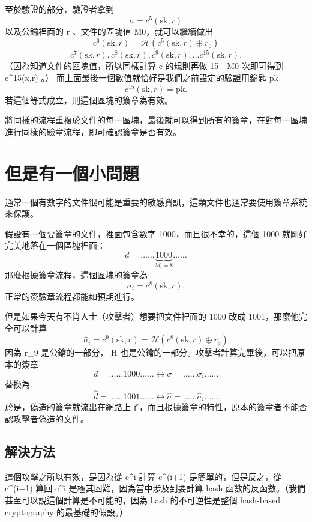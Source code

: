 \documentclass[
]{article}
\begin{document}
至於驗證的部分，驗證者拿到 \[
\sigma = c^{5}(\mathrm{sk},r)
\] 以及公鑰裡面的 r 、文件的區塊值 M0，就可以繼續做出 \[
c^{6}(\mathrm{sk},r) = \mathcal{H}(c^{5}(\mathrm{sk},r)\oplus r_{6})
\] \[
c^{7}(\mathrm{sk},r), c^{8}(\mathrm{sk},r),   c^{9}(\mathrm{sk},r), \dots  c^{15}(\mathrm{sk},r). 
\] （因為知道文件的區塊值，所以同樣計算 c 的規則再做 15 - M0 次即可得到
c\^{}15(x,r) 。） 而上面最後一個數值就恰好是我們之前設定的驗證用鑰匙 pk
\[
c^{15}(\mathrm{sk},r) = \mathrm{pk}.
\] 若這個等式成立，則這個區塊的簽章為有效。

將同樣的流程重複於文件的每一區塊，最後就可以得到所有的簽章，在對每一區塊進行同樣的驗章流程，即可確認簽章是否有效。

\hypertarget{ux4f46ux662fux6709ux4e00ux500bux5c0fux554fux984c}{%
\section{但是有一個小問題}\label{ux4f46ux662fux6709ux4e00ux500bux5c0fux554fux984c}}

通常一個有數字的文件很可能是重要的敏感資訊，這類文件也通常要使用簽章系統來保護。

假設有一個要簽章的文件，裡面包含數字 1000，而且很不幸的，這個 1000
就剛好完美地落在一個區塊裡面： \[
d = \dots\dots \underbrace{ 1000 }_{ M_{i} = 8 } \dots\dots
\] 那麼根據簽章流程，這個區塊的簽章為 \[
\sigma_{i} =c^{8}(\mathrm{sk},r).
\] 正常的簽驗章流程都能如預期進行。

但是如果今天有不肖人士（攻擊者）想要把文件裡面的 1000 改成
1001，那麼他完全可以計算 \[
\hat{\sigma}_{i} =  c^{9}(\mathrm{sk},r)  = \mathcal{H}(c^{8}(\mathrm{sk},r)\oplus r_{9})
\] 因為 r\_9 是公鑰的一部分， H
也是公鑰的一部分。攻擊者計算完畢後，可以把原本的簽章 \[
d = \dots\dots 1000\dots\ldots \leftrightarrow \sigma = \dots\dots \sigma_{i}\dots\ldots 
\] 替換為 \[
\hat{d} = \dots\dots 1001\dots\ldots \leftrightarrow \hat{\sigma} = \dots\dots \hat{\sigma}_{i}\dots\ldots 
\]
於是，偽造的簽章就流出在網路上了，而且根據簽章的特性，原本的簽章者不能否認攻擊者偽造的文件。

\hypertarget{ux89e3ux6c7aux65b9ux6cd5}{%
\subsection{解決方法}\label{ux89e3ux6c7aux65b9ux6cd5}}

這個攻擊之所以有效，是因為從 c\^{}i 計算 c\^{}(i+1)
是簡單的，但是反之，從 c\^{}(i+1) 算回 c\^{}i
是極其困難，因為當中涉及到要計算 hash
函數的反函數。（我們甚至可以說這個計算是不可能的，因為 hash
的不可逆性是整個 hash-based cryptography 的最基礎的假設。）
\end{document}
